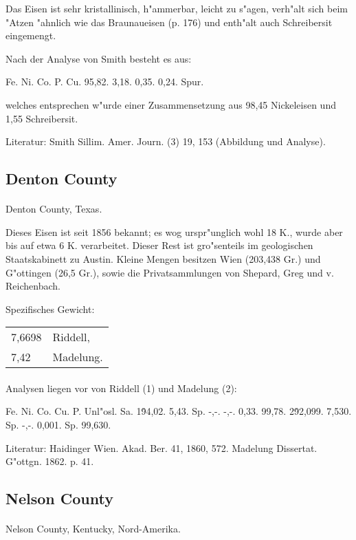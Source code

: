 \documentclass[a4paper, 11pt, oneside]{article}
\begin{document}
Das Eisen ist sehr kristallinisch, h"ammerbar, leicht zu s"agen, verh"alt sich beim "Atzen "ahnlich wie das Braunaueisen (p. 176) und enth"alt auch Schreibersit eingemengt.

Nach der Analyse von Smith besteht es aus:

Fe. Ni. Co. P. Cu.  
95,82. 3,18. 0,35. 0,24. Spur.

welches entsprechen w"urde einer Zusammensetzung aus 98,45 Nickeleisen und 1,55 Schreibersit.

Literatur: Smith Sillim. Amer. Journ. (3) 19, 153 (Abbildung und Analyse).

\subsection{Denton County}
\normalsize
\paragraph{}
Denton County, Texas.

Dieses Eisen ist seit 1856 bekannt; es wog urspr"unglich wohl 18 K., wurde aber bis auf etwa 6 K. verarbeitet. Dieser Rest ist gro"senteils im geologischen Staatskabinett zu Austin. Kleine Mengen besitzen Wien (203,438 Gr.) und G"ottingen (26,5 Gr.), sowie die Privatsammlungen von Shepard, Greg und v. Reichenbach.

Spezifisches Gewicht:  
\begin{table}[!ht]
    \centering
    \begin{tabular}{l l}
        7,6698 & Riddell,\\
        7,42 & Madelung.
    \end{tabular}
\end{table}
\paragraph{}
Analysen liegen vor von Riddell (1) und Madelung (2):

Fe. Ni. Co. Cu. P. Unl"osl. Sa.  
1\. 94,02. 5,43. Sp. -,-. -,-. 0,33. 99,78.  
2\. 92,099. 7,530. Sp. -,-. 0,001. Sp. 99,630.

Literatur: Haidinger Wien. Akad. Ber. 41, 1860, 572. Madelung Dissertat. G"ottgn. 1862. p. 41.

\subsection{Nelson County}
\normalsize
\paragraph{}
Nelson County, Kentucky, Nord-Amerika.
\end{document}
